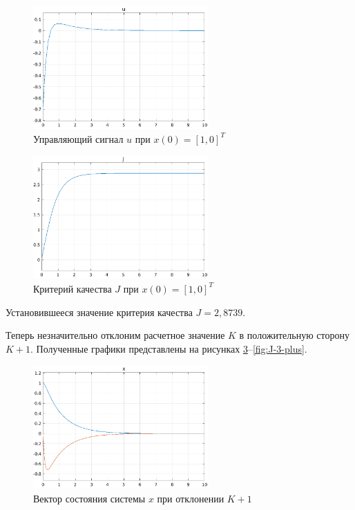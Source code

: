 \documentclass[14pt, a4paper]{extarticle}
\begin{document}
	\begin{figure}[h]
		\centering
		\includegraphics[width=0.6\textwidth]{u-2}
		\caption{Управляющий сигнал $u$ при $x(0)=[1,0]^T$}
		\label{fig:u-2}
	\end{figure}

	\begin{figure}[H]
		\centering
		\includegraphics[width=0.6\textwidth]{J-2}
		\caption{Критерий качества $J$ при $x(0)=[1,0]^T$}
		\label{fig:J-2}
	\end{figure}

	Установившееся значение критерия качества $J=2,8739$.
	
	Теперь незначительно отклоним расчетное значение $K$ в положительную сторону $K+1$. Полученные графики представлены на рисунках \ref{fig:x-3-plus}--\ref{fig:J-3-plus}.
	
	\begin{figure}[h]
		\centering
		\includegraphics[width=0.6\textwidth]{x-3-plus}
		\caption{Вектор состояния системы $x$ при отклонении $K+1$}
		\label{fig:x-3-plus}
	\end{figure}
	
\end{document}

